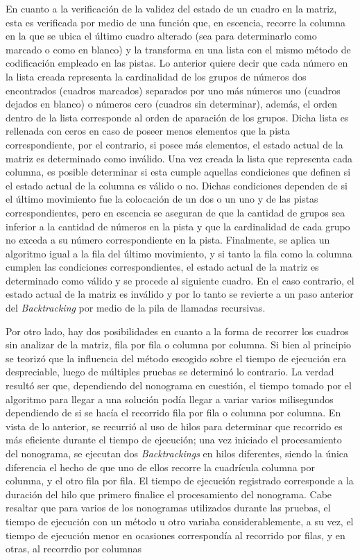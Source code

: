 \documentclass[conference]{IEEEtran}
\begin{document}
En cuanto a la verificación de la validez del estado de un cuadro en la matriz, esta es verificada por medio de una función que, en escencia, recorre la columna en la que se ubica el último cuadro alterado (sea para determinarlo como marcado o como en blanco) y la transforma en una lista con el mismo método de codificación empleado en las pistas. Lo anterior quiere decir que cada número en la lista creada representa la cardinalidad de los grupos de números dos encontrados (cuadros marcados) separados por uno más números uno (cuadros dejados en blanco) o números cero (cuadros sin determinar), además, el orden dentro de la lista corresponde al orden de aparación de los grupos. Dicha lista es rellenada con ceros en caso de poseer menos elementos que la pista correspondiente, por el contrario, si posee más elementos, el estado actual de la matriz es determinado como inválido. Una vez creada la lista que representa cada columna, es posible determinar si esta cumple aquellas condiciones que definen si el estado actual de la columna es válido o no. Dichas condiciones dependen de si el último movimiento fue la colocación de un dos o un uno y de las pistas correspondientes, pero en escencia se aseguran de que la cantidad de grupos sea inferior a la cantidad de números en la pista y que la cardinalidad de cada grupo no exceda a su número correspondiente en la pista. Finalmente, se aplica un algoritmo igual a la fila del último movimiento, y si tanto la fila como la columna cumplen las condiciones correspondientes, el estado actual de la matriz es determinado como válido y se procede al siguiente cuadro. En el caso contrario, el estado actual de la matriz es inválido y por lo tanto se revierte a un paso anterior del \textit{Backtracking} por medio de la pila de llamadas recursivas.

Por otro lado, hay dos posibilidades en cuanto a la forma de recorrer los cuadros sin analizar de la matriz, fila por fila o columna por columna. Si bien al principio se teorizó que la influencia del método escogido sobre el tiempo de ejecución era despreciable, luego de múltiples pruebas se determinó lo contrario. La verdad resultó ser que, dependiendo del nonograma en cuestión, el tiempo tomado por el algoritmo para llegar a una solución podía llegar a variar varios milisegundos dependiendo de si se hacía el recorrido fila por fila o columna por columna. En vista de lo anterior, se recurrió al uso de hilos para determinar que recorrido es más eficiente durante el tiempo de ejecución; una vez iniciado el procesamiento del nonograma, se ejecutan dos \textit{Backtrackings} en hilos diferentes, siendo la única diferencia el hecho de que uno de ellos recorre la cuadrícula columna por columna, y el otro fila por fila. El tiempo de ejecución registrado corresponde a la duración del hilo que primero finalice el procesamiento del nonograma. Cabe resaltar que para varios de los nonogramas utilizados durante las pruebas, el tiempo de ejecución con un método u otro variaba considerablemente, a su vez, el tiempo de ejecución menor en ocasiones correspondía
al recorrido por filas, y en otras, al recorrdio por columnas 
\end{document}
